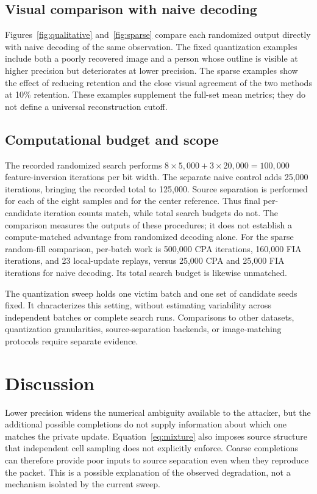 \documentclass{article}
\begin{document}
\subsection{Visual comparison with naive decoding}
\label{sec:qualitative}
Figures~\ref{fig:qualitative} and~\ref{fig:sparse} compare each randomized
output directly with naive decoding of the same observation. The fixed
quantization examples include both a poorly recovered image and a person
whose outline is visible at higher precision but deteriorates at lower
precision. The sparse examples show the effect of reducing retention and
the close visual agreement of the two methods at 10\% retention.
These examples supplement the full-set mean metrics; they do not define
a universal reconstruction cutoff.

\subsection{Computational budget and scope}
\label{sec:budget}
The recorded randomized search performs
$8\times5{,}000+3\times20{,}000=100{,}000$ feature-inversion iterations
per bit width. The separate naive control adds 25,000 iterations,
bringing the recorded total to 125,000. Source separation is performed
for each of the eight samples and for the center reference. Thus final
per-candidate iteration counts match, while total search budgets do not.
The comparison measures the outputs of these procedures; it does not
establish a compute-matched advantage from randomized decoding alone.
For the sparse random-fill comparison, per-batch work is 500,000 CPA
iterations, 160,000 FIA iterations, and 23 local-update replays, versus
25,000 CPA and 25,000 FIA iterations for naive decoding. Its total search
budget is likewise unmatched.

The quantization sweep holds one victim batch and one set of candidate seeds fixed.
It characterizes this setting, without estimating variability across
independent batches or complete search runs. Comparisons to other
datasets, quantization granularities, source-separation backends, or
image-matching protocols require separate evidence.

\section{Discussion}
\label{sec:discussion}
Lower precision widens the numerical ambiguity available to the attacker,
but the additional possible completions do not supply information about
which one matches the private update. Equation~\ref{eq:mixture} also
imposes source structure that independent cell sampling does not
explicitly enforce. Coarse completions can therefore provide poor
inputs to source separation even when they reproduce the packet.
This is a possible explanation of the observed degradation, not a
mechanism isolated by the current sweep.
\end{document}
